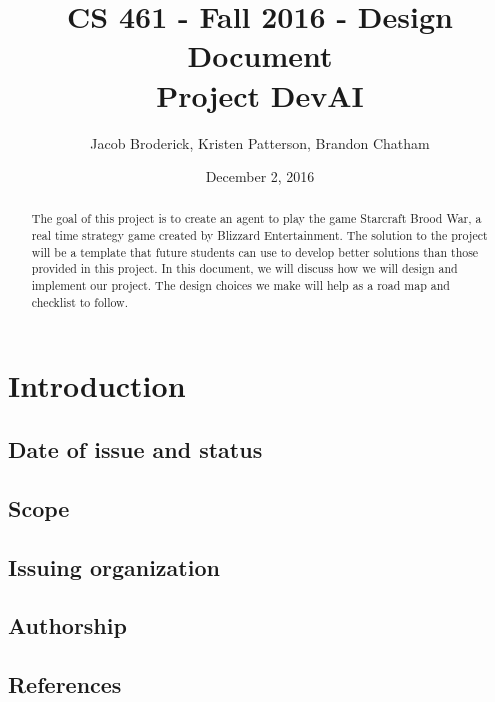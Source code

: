 \documentclass[10pt,letterpaper,onecolumn,draftclsnofoot]{IEEEtran}
\begin{document}
\begin{titlepage}

  \title{CS 461 - Fall 2016 - Design Document \\ Project DevAI}
  \author{Jacob Broderick, Kristen Patterson, Brandon Chatham}
  \date{December 2, 2016}
  \maketitle
  \vspace{4cm}
  \begin{abstract}
  	\noindent 
  	  	\noindent
	The goal of this project is to create an agent to play the game Starcraft Brood War, a real time strategy game created by Blizzard Entertainment. The solution to the project will be a template that future students can use to develop better solutions than those provided in this project. In this document, we will discuss how we will design and implement our project. The design choices we make will help as a road map and checklist to follow.
   \end{abstract}
\end{titlepage}

\tableofcontents

\newpage

\section{Introduction}
\subsection{Date of issue and status}

\subsection{Scope}

\subsection{Issuing organization}

\subsection{Authorship}

\subsection{References}
\end{document}
